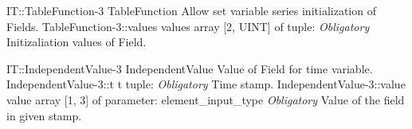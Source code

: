 \begin{RecordType}
	{IT::TableFunction-3}
	{TableFunction}
	{}%
	{}%
	{{{Allow set variable series initialization of Fields.}%
}}
		\RecKey
			{TableFunction-3::values}
			{values}
			{{array [2, UINT] of }{tuple: }}{}
			{ \it{Obligatory}}
			{{{Initizaliation values of Field.}%
}}
\end{RecordType}
\begin{TupleType}
	{IT::IndependentValue-3}
	{IndependentValue}
	{}%
	{}%
	{{{Value of Field for time variable.}%
}}
		\RecKey
			{IndependentValue-3::t}
			{t}
			{{tuple: }}{}
			{ \it{Obligatory}}
			{{{Time stamp.}%
}}
		\RecKey
			{IndependentValue-3::value}
			{value}
			{{array [1, 3] of }{parameter: element{\_}input{\_}type}}{}
			{ \it{Obligatory}}
			{{{Value of the field in given stamp.}%
}}
\end{TupleType}
